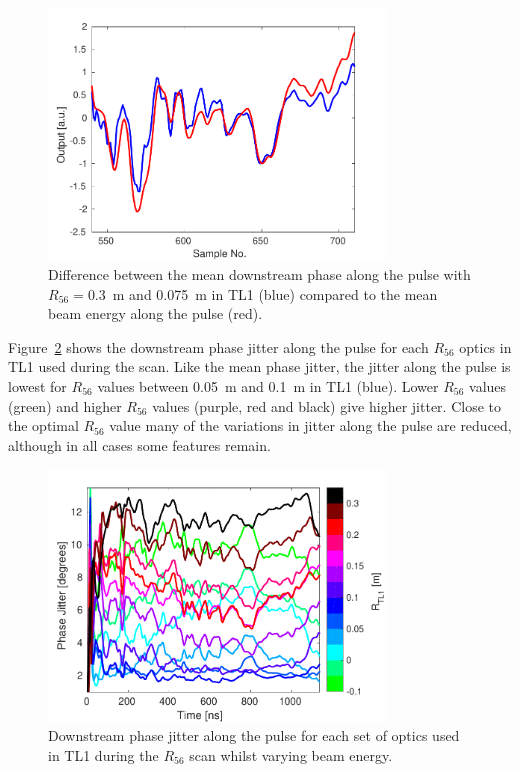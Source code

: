 \begin{figure}
  \centering
  \includegraphics[width=0.8\textwidth]{Figures/propagation/r56Scan_comparisonPhaseEnergy}
  \caption{Difference between the mean downstream phase along the pulse with \(R_{56} = 0.3\)~m and 0.075~m in TL1 (blue) compared to the mean beam energy along the pulse (red).}
  \label{f:r56Scan_comparisonPhaseEnergy}
\end{figure}

Figure~\ref{f:R56ScanGunWiggle_JitterAlong} shows the downstream phase jitter along the pulse for each \(R_{56}\) optics in TL1 used during the scan. Like the mean phase jitter, the jitter along the pulse is lowest for \(R_{56}\) values between 0.05~m and 0.1~m in TL1 (blue). Lower \(R_{56}\) values (green) and higher \(R_{56}\) values (purple, red and black) give higher jitter. Close to the optimal \(R_{56}\) value many of the variations in jitter along the pulse are reduced, although in all cases some features remain.

\begin{figure}
  \centering
  \includegraphics[width=0.8\textwidth]{Figures/propagation/R56ScanGunWiggle_JitterAlong}
  \caption{Downstream phase jitter along the pulse for each set of optics used in TL1 during the \(R_{56}\) scan whilst varying beam energy.}
  \label{f:R56ScanGunWiggle_JitterAlong}
\end{figure}

